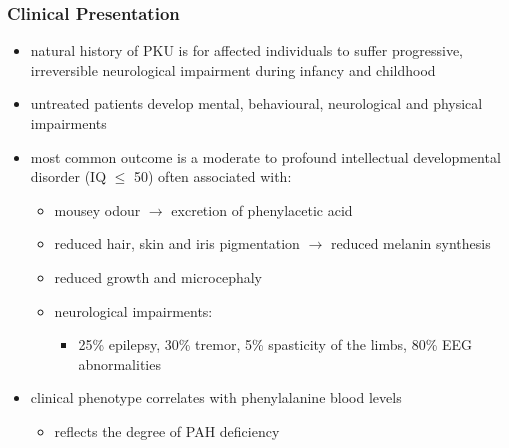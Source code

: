 \documentclass{scrartcl}
\begin{document}
\subsubsection{Clinical Presentation}
\label{sec:org0f7e70b}
\begin{itemize}
\item natural history of PKU is for affected individuals to suffer
progressive, irreversible neurological impairment during infancy and
childhood
\item untreated patients develop mental, behavioural, neurological and
physical impairments
\item most common outcome is a moderate to profound intellectual
developmental disorder (IQ \(\le\) 50) often associated with:
\begin{itemize}
\item mousey odour \(\to\) excretion of phenylacetic acid
\item reduced hair, skin and iris pigmentation \(\to\) reduced melanin synthesis
\item reduced growth and microcephaly
\item neurological impairments:
\begin{itemize}
\item 25\% epilepsy, 30\% tremor, 5\% spasticity of the limbs, 80\% EEG abnormalities
\end{itemize}
\end{itemize}
\item clinical phenotype correlates with phenylalanine blood levels
\begin{itemize}
\item reflects the degree of PAH deficiency
\end{itemize}
\end{itemize}
\end{document}
